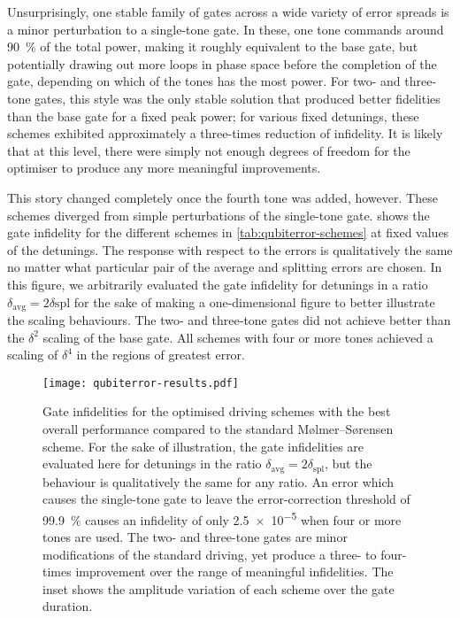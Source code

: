 Unsurprisingly, one stable family of gates across a wide variety of error spreads is a minor perturbation to a single-tone gate.
In these, one tone commands around \qty{90}{\percent} of the total power, making it roughly equivalent to the base gate, but potentially drawing out more loops in phase space before the completion of the gate, depending on which of the tones has the most power.
For two- and three-tone gates, this style was the only stable solution that produced better fidelities than the base gate for a fixed peak power; for various fixed detunings, these schemes exhibited approximately a three-times reduction of infidelity.
It is likely that at this level, there were simply not enough degrees of freedom for the optimiser to produce any more meaningful improvements.

This story changed completely once the fourth tone was added, however.
These schemes diverged from simple perturbations of the single-tone gate.
 shows the gate infidelity for the different schemes in \cref{tab:qubiterror-schemes} at fixed values of the detunings.
The response with respect to the errors is qualitatively the same no matter what particular pair of the average and splitting errors are chosen.
In this figure, we arbitrarily evaluated the gate infidelity for detunings in a ratio $\delta_{\text{avg}} = 2\delta{\text{spl}}$ for the sake of making a one-dimensional figure to better illustrate the scaling behaviours.
The two- and three-tone gates did not achieve better than the $\delta^2$ scaling of the base gate.
All schemes with four or more tones achieved a scaling of $\delta^4$ in the regions of greatest error.

\begin{figure}%
    \texttt{[image: qubiterror-results.pdf]}%
    \caption[Fidelity properties of the robust multi-tone M\o lmer--S\o rensen gate]{\label{fig:qubiterror-multitone}%
        Gate infidelities for the optimised driving schemes with the best overall performance compared to the standard M\o lmer--S\o rensen scheme.
        For the sake of illustration, the gate infidelities are evaluated here for detunings in the ratio
$\delta_{\text{avg}} = 2\delta_{\text{spl}}$, but the behaviour is qualitatively the same for any ratio.
        An error which causes the single-tone gate to leave the error-correction threshold of \qty{99.9}{\percent} causes an infidelity of only \num{2.5e-5} when four or more tones are used.
        The two- and three-tone gates are minor modifications of the standard driving, yet produce a three- to four-times improvement over the range of meaningful infidelities.
        The inset shows the amplitude variation of each scheme over the gate duration.
    }%
\end{figure}


